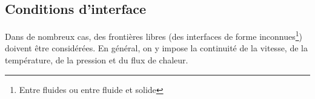     \subsection{Conditions d'interface}
      Dans de nombreux cas, des frontières libres (des interfaces de forme inconnues\footnote{Entre fluides ou entre fluide et solide}) doivent être considérées. En général, on y impose la continuité de la vitesse, de la température, de la pression et du flux de chaleur.
